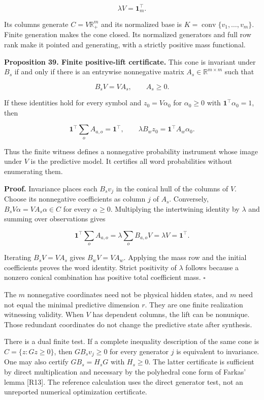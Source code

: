 \documentclass[11pt,letterpaper]{article}
\begin{document}
\[
\lambda V=\mathbf1_m^\top.
\]

Its columns generate \(C=V\mathbb R_+^m\) and its normalized base is
\(K=\operatorname{conv}\{v_1,\ldots,v_m\}\). Finite generation makes the
cone closed. Its normalized generators and full row rank make it pointed
and generating, with a strictly positive mass functional.

\textbf{Proposition 39. Finite positive-lift certificate.} This cone is
invariant under \(B_s\) if and only if there is an entrywise nonnegative
matrix \(A_s\in\mathbb R^{m\times m}\) such that

\[
\boxed{B_sV=VA_s,\qquad A_s\geq0.}
\]

If these identities hold for every symbol and \(z_0=V\alpha_0\) for
\(\alpha_0\geq0\) with \(\mathbf1^\top\alpha_0=1\), then

\[
\mathbf1^\top\sum_o A_{a,o}=\mathbf1^\top,
\qquad
\lambda B_wz_0=\mathbf1^\top A_w\alpha_0.
\]

Thus the finite witness defines a nonnegative probability instrument
whose image under \(V\) is the predictive model. It certifies all word
probabilities without enumerating them.

\textbf{Proof.} Invariance places each \(B_sv_j\) in the conical hull of
the columns of \(V\). Choose its nonnegative coefficients as column
\(j\) of \(A_s\). Conversely, \(B_sV\alpha=VA_s\alpha\in C\) for every
\(\alpha\geq0\). Multiplying the intertwining identity by \(\lambda\)
and summing over observations gives

\[
\mathbf1^\top\sum_oA_{a,o}
=\lambda\sum_oB_{a,o}V
=\lambda V=\mathbf1^\top.
\]

Iterating \(B_sV=VA_s\) gives \(B_wV=VA_w\). Applying the mass row and
the initial coefficients proves the word identity. Strict positivity of
\(\lambda\) follows because a nonzero conical combination has positive
total coefficient mass. \(\square\)

The \(m\) nonnegative coordinates need not be physical hidden states,
and \(m\) need not equal the minimal predictive dimension \(r\). They
are one finite realization witnessing validity. When \(V\) has dependent
columns, the lift can be nonunique. Those redundant coordinates do not
change the predictive state after synthesis.

There is a dual finite test. If a complete inequality description of the
same cone is \(C=\{z:Gz\geq0\}\), then \(GB_sv_j\geq0\) for every
generator \(j\) is equivalent to invariance. One may also certify
\(GB_s=H_sG\) with \(H_s\geq0\). The latter certificate is sufficient by
direct multiplication and necessary by the polyhedral cone form of
Farkas' lemma {[}R13{]}. The reference calculation uses the direct
generator test, not an unreported numerical optimization certificate.
\end{document}

